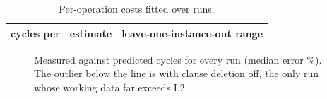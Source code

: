 \begin{table}[ht]
\centering\small
\begin{tabular}{lrc}
\toprule
cycles per & estimate & leave-one-instance-out range \\
\midrule

\end{tabular}
\caption{Per-operation costs fitted over \numModelRuns{} runs.}
\label{tab:coef}
\end{table}

\begin{figure}[ht]
\centering
{}
\caption{Measured against predicted cycles for every run (median error
\numModelMedianErr\%). The outlier below the line is  with
clause deletion off, the only run whose working data far exceeds L2.}
\label{fig:costmodel}
\end{figure}
